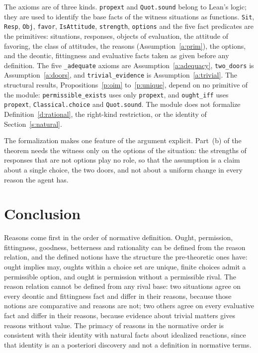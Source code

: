\documentclass{situationist-preprint}
\begin{document}
The axioms are of three kinds. \texttt{propext} and \texttt{Quot.sound} belong to Lean's logic; they are used to identify the base facts of the witness situations as functions. \texttt{Sit}, \texttt{Resp}, \texttt{Obj}, \texttt{favor}, \texttt{IsAttitude}, \texttt{strength}, \texttt{options} and the five fact predicates are the primitives: situations, responses, objects of evaluation, the attitude of favoring, the class of attitudes, the reasons (Assumption~\ref{a:prim}), the options, and the deontic, fittingness and evaluative facts taken as given before any definition. The five \texttt{\_adequate} axioms are Assumption~\ref{a:adequacy}, \texttt{two\_doors} is Assumption~\ref{a:doors}, and \texttt{trivial\_evidence} is Assumption~\ref{a:trivial}. The structural results, Propositions~\ref{p:oim} to~\ref{p:unique}, depend on no primitive of the module: \texttt{permissible\_exists} uses only \texttt{propext}, and \texttt{ought\_iff} uses \texttt{propext}, \texttt{Classical.choice} and \texttt{Quot.sound}. The module does not formalize Definition~\ref{d:rational}, the right-kind restriction, or the identity of Section~\ref{s:natural}.

The formalization makes one feature of the argument explicit. Part~(b) of the theorem needs the witness only on the options of the situation: the strengths of responses that are not options play no role, so that the assumption is a claim about a single choice, the two doors, and not about a uniform change in every reason the agent has.

\section{Conclusion}

Reasons come first in the order of normative definition. Ought, permission, fittingness, goodness, betterness and rationality can be defined from the reason relation, and the defined notions have the structure the pre-theoretic ones have: ought implies may, oughts within a choice set are unique, finite choices admit a permissible option, and ought is permission without a permissible rival. The reason relation cannot be defined from any rival base: two situations agree on every deontic and fittingness fact and differ in their reasons, because those notions are comparative and reasons are not; two others agree on every evaluative fact and differ in their reasons, because evidence about trivial matters gives reasons without value. The primacy of reasons in the normative order is consistent with their identity with natural facts about idealized reactions, since that identity is an a posteriori discovery and not a definition in normative terms.
\end{document}
